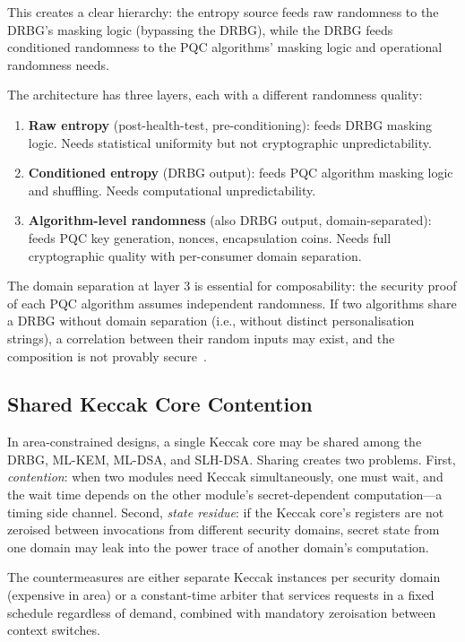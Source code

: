 This creates a clear hierarchy: the entropy source feeds raw randomness to the DRBG's masking logic (bypassing the DRBG), while the DRBG feeds conditioned randomness to the PQC algorithms' masking logic and operational randomness needs.

The architecture has three layers, each with a different randomness quality:
\begin{enumerate}
\item \textbf{Raw entropy} (post-health-test, pre-conditioning): feeds DRBG masking logic.  Needs statistical uniformity but not cryptographic unpredictability.
\item \textbf{Conditioned entropy} (DRBG output): feeds PQC algorithm masking logic and shuffling.  Needs computational unpredictability.
\item \textbf{Algorithm-level randomness} (also DRBG output, domain-separated): feeds PQC key generation, nonces, encapsulation coins.  Needs full cryptographic quality with per-consumer domain separation.
\end{enumerate}

The domain separation at layer 3 is essential for composability: the security proof of each PQC algorithm assumes independent randomness.  If two algorithms share a DRBG without domain separation (i.e., without distinct personalisation strings), a correlation between their random inputs may exist, and the composition is not provably secure~\cite{FIPS203, FIPS204}.

\subsection{Shared Keccak Core Contention}
\label{subsec:shared-keccak}

In area-constrained designs, a single Keccak core may be shared among the DRBG, ML-KEM, ML-DSA, and SLH-DSA.  Sharing creates two problems.  First, \emph{contention}: when two modules need Keccak simultaneously, one must wait, and the wait time depends on the other module's secret-dependent computation---a timing side channel.  Second, \emph{state residue}: if the Keccak core's registers are not zeroised between invocations from different security domains, secret state from one domain may leak into the power trace of another domain's computation.

The countermeasures are either separate Keccak instances per security domain (expensive in area) or a constant-time arbiter that services requests in a fixed schedule regardless of demand, combined with mandatory zeroisation between context switches.

